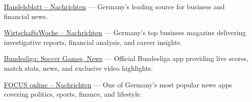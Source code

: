 

\begin{cventries}

  \cvaboutme
    {} %
    {} %
    {} %
    {} %
    {
      \begin{cvitems} %
       \item {\href{https://play.google.com/store/apps/details?id=com.handelsblatt.live}{Handelsblatt – Nachrichten} — Germany’s leading source for business and financial news.}
  \item {\href{https://play.google.com/store/apps/details?id=de.wiwo.one}{WirtschaftsWoche – Nachrichten} — Germany’s top business magazine delivering investigative reports, financial analysis, and career insights.}
  \item {\href{https://play.google.com/store/apps/details?id=com.bundesliga}{Bundesliga: Soccer Games, News} — Official Bundesliga app providing live scores, match stats, news, and exclusive video highlights.}
  \item {\href{https://play.google.com/store/apps/details?id=de.cellular.focus}{FOCUS online – Nachrichten} — One of Germany’s most popular news apps covering politics, sports, finance, and lifestyle.}     %
      \end{cvitems}
    }



\end{cventries}
